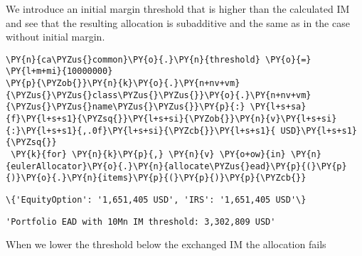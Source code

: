     We introduce an initial margin threshold that is higher than the
calculated IM and see that the resulting allocation is subadditive and
the same as in the case without initial margin.

    \begin{tcolorbox}[breakable, size=fbox, boxrule=1pt, pad at break*=1mm,colback=cellbackground, colframe=cellborder]
\begin{Verbatim}[commandchars=\\\{\}]
\PY{n}{ca\PYZus{}common}\PY{o}{.}\PY{n}{threshold} \PY{o}{=} \PY{l+m+mi}{10000000}
\PY{p}{\PYZob{}}\PY{n}{k}\PY{o}{.}\PY{n+nv+vm}{\PYZus{}\PYZus{}class\PYZus{}\PYZus{}}\PY{o}{.}\PY{n+nv+vm}{\PYZus{}\PYZus{}name\PYZus{}\PYZus{}}\PY{p}{:} \PY{l+s+sa}{f}\PY{l+s+s1}{\PYZsq{}}\PY{l+s+si}{\PYZob{}}\PY{n}{v}\PY{l+s+si}{:}\PY{l+s+s1}{,.0f}\PY{l+s+si}{\PYZcb{}}\PY{l+s+s1}{ USD}\PY{l+s+s1}{\PYZsq{}}
 \PY{k}{for} \PY{n}{k}\PY{p}{,} \PY{n}{v} \PY{o+ow}{in} \PY{n}{eulerAllocator}\PY{o}{.}\PY{n}{allocate\PYZus{}ead}\PY{p}{(}\PY{p}{)}\PY{o}{.}\PY{n}{items}\PY{p}{(}\PY{p}{)}\PY{p}{\PYZcb{}}
\end{Verbatim}
\end{tcolorbox}

            \begin{tcolorbox}[breakable, size=fbox, boxrule=.5pt, pad at break*=1mm, opacityfill=0]
\begin{Verbatim}[commandchars=\\\{\}]
\{'EquityOption': '1,651,405 USD', 'IRS': '1,651,405 USD'\}
\end{Verbatim}
\end{tcolorbox}
        
            \begin{tcolorbox}[breakable, size=fbox, boxrule=.5pt, pad at break*=1mm, opacityfill=0]
\begin{Verbatim}[commandchars=\\\{\}]
'Portfolio EAD with 10Mn IM threshold: 3,302,809 USD'
\end{Verbatim}
\end{tcolorbox}
        
    When we lower the threshold below the exchanged IM the allocation fails

